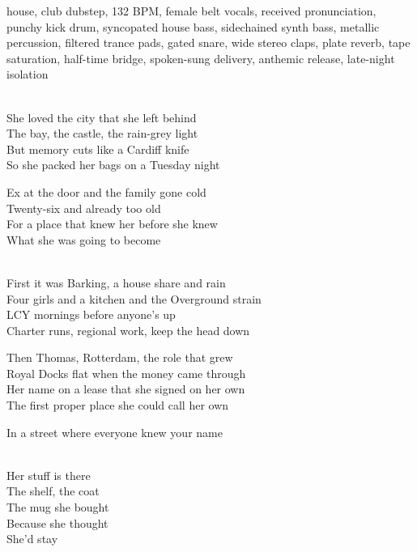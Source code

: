 

\begin{notes}
\end{notes}

\begin{style}
house, club dubstep, 132 BPM, female belt vocals, received pronunciation, punchy kick drum, syncopated house bass, sidechained synth bass, metallic percussion, filtered trance pads, gated snare, wide stereo claps, plate reverb, tape saturation, half-time bridge, spoken-sung delivery, anthemic release, late-night isolation
\end{style}

\begin{lyrics}

\\
She loved the city that she left behind\\
The bay, the castle, the rain-grey light\\
But memory cuts like a Cardiff knife\\
So she packed her bags on a Tuesday night

Ex at the door and the family gone cold\\
Twenty-six and already too old\\
For a place that knew her before she knew\\
What she was going to become

\\
First it was Barking, a house share and rain\\
Four girls and a kitchen and the Overground strain\\
LCY mornings before anyone's up\\
Charter runs, regional work, keep the head down

Then Thomas, Rotterdam, the role that grew\\
Royal Docks flat when the money came through\\
Her name on a lease that she signed on her own\\
The first proper place she could call her own

In a street where everyone knew your name

\\
Her stuff is there\\
The shelf, the coat\\
The mug she bought\\
Because she thought\\
She'd stay


\end{lyrics}
